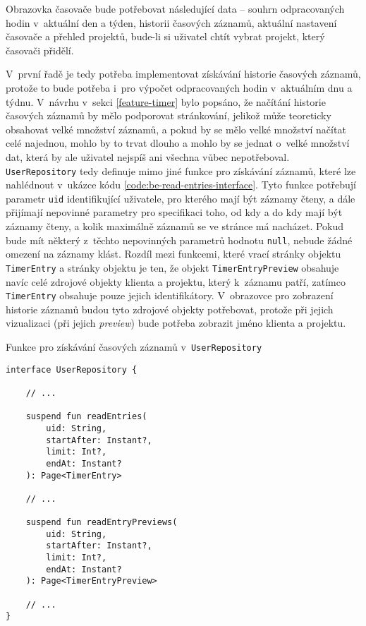 Obrazovka časovače bude potřebovat následující data – souhrn odpracovaných hodin v~aktuální den a týden, historii časových záznamů, aktuální nastavení časovače a přehled projektů, bude-li si uživatel chtít vybrat projekt, který časovači přidělí.

V~první řadě je tedy potřeba implementovat získávání historie časových záznamů, protože to bude potřeba i~pro výpočet odpracovaných hodin v~aktuálním dnu a týdnu. V~návrhu v~sekci \ref{feature-timer} bylo popsáno, že načítání historie časových záznamů by mělo podporovat stránkování, jelikož může teoreticky obsahovat velké množství záznamů, a pokud by se mělo velké množství načítat celé najednou, mohlo by to trvat dlouho a mohlo by se jednat o~velké množství dat, která by ale uživatel nejspíš ani všechna vůbec nepotřeboval. \texttt{UserRepository} tedy definuje mimo jiné funkce pro získávání záznamů, které lze nahlédnout v~ukázce kódu \ref{code:be-read-entries-interface}. Tyto funkce potřebují parametr \texttt{uid} identifikující uživatele, pro kterého mají být záznamy čteny, a dále přijímají nepovinné parametry pro specifikaci toho, od kdy a do kdy mají být záznamy čteny, a kolik maximálně záznamů se ve stránce má nacházet. Pokud bude mít některý z~těchto nepovinných parametrů hodnotu \texttt{null}, nebude žádné omezení na záznamy klást. Rozdíl mezi funkcemi, které vrací stránky objektu \texttt{TimerEntry} a stránky objektu  je ten, že objekt \texttt{TimerEntryPreview} obsahuje navíc celé zdrojové objekty klienta a projektu, který k~záznamu patří, zatímco \texttt{TimerEntry} obsahuje pouze jejich identifikátory. V~obrazovce pro zobrazení historie záznamů budou tyto zdrojové objekty potřebovat, protože při jejich vizualizaci (při jejich \emph{preview}) bude potřeba zobrazit jméno klienta a projektu.

\begin{listing}
\caption{Funkce pro získávání časových záznamů v~\texttt{UserRepository}}\label{code:be-read-entries-interface}
\begin{verbatim}
interface UserRepository {

    // ...
    
    suspend fun readEntries(
        uid: String,
        startAfter: Instant?,
        limit: Int?,
        endAt: Instant?
    ): Page<TimerEntry>
    
    // ...
    
    suspend fun readEntryPreviews(
        uid: String,
        startAfter: Instant?,
        limit: Int?,
        endAt: Instant?
    ): Page<TimerEntryPreview>
    
    // ...
}
\end{verbatim}
\end{listing}

